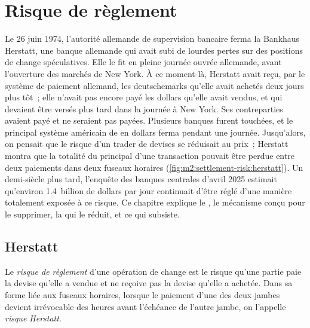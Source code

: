 \chapter{Risque de règlement}\label{ch:m2:settlement-risk}

Le 26 juin 1974, l'autorité allemande de supervision bancaire ferma la Bankhaus Herstatt, une
banque allemande qui avait subi de lourdes pertes sur des positions de change spéculatives. Elle le fit
en pleine journée ouvrée allemande, avant l'ouverture des marchés de New York.
À ce moment-là, Herstatt avait reçu, par le système de paiement allemand, les
deutschemarks qu'elle avait achetés deux jours plus tôt~; elle n'avait pas encore payé les dollars
qu'elle avait vendus, et qui devaient être versés plus tard dans la journée à New York. Ses contreparties avaient
payé et ne seraient pas payées. Plusieurs banques furent touchées, et le principal
système américain de  en dollars ferma pendant une journée. Jusqu'alors, on pensait que le risque
d'un trader de devises se réduisait au prix~; Herstatt montra que la totalité
du principal d'une transaction pouvait être perdue entre deux paiements dans deux fuseaux horaires
(\cref{fig:m2:settlement-risk:herstatt}). Un demi-siècle plus tard,
l'enquête des banques centrales d'avril 2025 estimait qu'environ 1.4~billion
de dollars par jour continuait d'être réglé d'une manière totalement exposée à ce risque. Ce
chapitre explique le , le mécanisme  conçu pour
le supprimer, la  qui le réduit, et ce qui subsiste.

\section{Herstatt}

\begin{definition}\label{def:m2:settlement-risk:risk}
Le \emph{risque de règlement} d'une opération de change est
le risque qu'une partie paie la devise qu'elle a vendue et ne reçoive pas la devise
qu'elle a achetée. Dans sa forme liée aux fuseaux horaires, lorsque le paiement d'une des deux jambes devient irrévocable
des heures avant l'échéance de l'autre jambe, on l'appelle \emph{risque
Herstatt}.
\end{definition}

